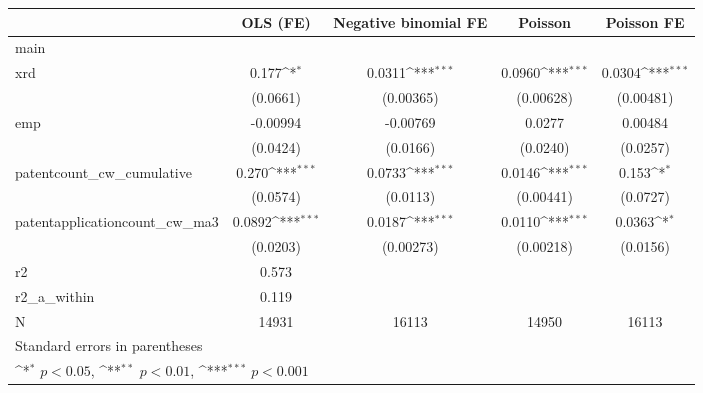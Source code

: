 {
\def\sym#1{\ifmmode^{#1}\else\(^{#1}\)\fi}
\begin{tabular}{l*{4}{c}}
\hline\hline
            &\multicolumn{1}{c}{OLS (FE)}&\multicolumn{1}{c}{Negative binomial FE}&\multicolumn{1}{c}{Poisson}&\multicolumn{1}{c}{Poisson FE}\\
\hline
main        &                     &                     &                     &                     \\
xrd         &       0.177\sym{*}  &      0.0311\sym{***}&      0.0960\sym{***}&      0.0304\sym{***}\\
            &    (0.0661)         &   (0.00365)         &   (0.00628)         &   (0.00481)         \\
[1em]
emp         &    -0.00994         &    -0.00769         &      0.0277         &     0.00484         \\
            &    (0.0424)         &    (0.0166)         &    (0.0240)         &    (0.0257)         \\
[1em]
patentcount\_cw\_cumulative&       0.270\sym{***}&      0.0733\sym{***}&      0.0146\sym{***}&       0.153\sym{*}  \\
            &    (0.0574)         &    (0.0113)         &   (0.00441)         &    (0.0727)         \\
[1em]
patentapplicationcount\_cw\_ma3&      0.0892\sym{***}&      0.0187\sym{***}&      0.0110\sym{***}&      0.0363\sym{*}  \\
            &    (0.0203)         &   (0.00273)         &   (0.00218)         &    (0.0156)         \\
\hline
r2          &       0.573         &                     &                     &                     \\
r2\_a\_within &       0.119         &                     &                     &                     \\
N           &       14931         &       16113         &       14950         &       16113         \\
\hline\hline
\multicolumn{5}{l}{\footnotesize Standard errors in parentheses}\\
\multicolumn{5}{l}{\footnotesize \sym{*} \(p<0.05\), \sym{**} \(p<0.01\), \sym{***} \(p<0.001\)}\\
\end{tabular}
}

